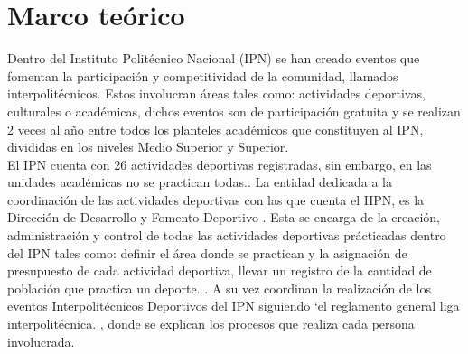 \chapter{Marco te\'orico}
	
	\noindent Dentro del Instituto Politécnico Nacional (IPN) se han creado eventos que fomentan la participación y competitividad de la comunidad, llamados interpolitécnicos. Estos involucran áreas tales como: actividades deportivas, culturales o académicas, dichos eventos son de participación gratuita y se realizan 2 veces al año entre todos los planteles académicos que constituyen al IPN, divididas en los niveles Medio Superior y Superior.  \cite{Reglas}\\
	\noident El IPN cuenta con 26 actividades deportivas registradas, sin embargo, en las unidades académicas no se practican todas.\cite{Reglas}.
	\noident La entidad dedicada a la coordinación de las actividades deportivas con las que cuenta el IIPN, es la Dirección de Desarrollo y Fomento Deportivo \cite{DDYFD}. Esta se encarga de la creación, administración y control de todas las actividades deportivas prácticadas dentro del IPN tales como: definir el área donde se practican y la asignación de presupuesto de cada actividad deportiva, llevar un registro de la cantidad de población que practica un deporte. \cite{Reglamento}.	
	\noident A su vez coordinan la realización de los eventos Interpolitécnicos Deportivos del IPN siguiendo ‘el reglamento general liga interpolitécnica. \cite{Reglamento}, donde se explican los  procesos que realiza cada persona involucrada.\\
	
